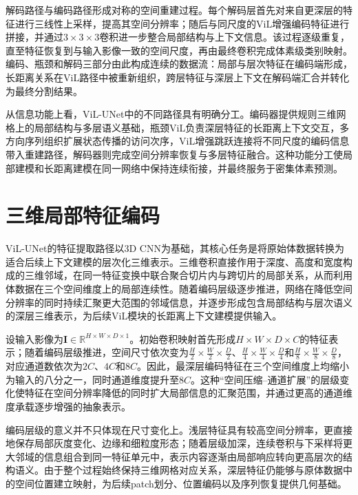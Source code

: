 解码路径与编码路径形成对称的空间重建过程。每个解码层首先对来自更深层的特征进行三线性上采样，提高其空间分辨率；随后与同尺度的ViL增强编码特征进行拼接，并通过\(3\times3\times3\)卷积进一步整合局部结构与上下文信息。该过程逐级重复，直至特征恢复到与输入影像一致的空间尺度，再由最终卷积完成体素级类别映射。编码、瓶颈和解码三部分由此构成连续的数据流：局部与层次特征在编码端形成，长距离关系在ViL路径中被重新组织，跨层特征与深层上下文在解码端汇合并转化为最终分割结果。

从信息功能上看，ViL-UNet中的不同路径具有明确分工。编码器提供规则三维网格上的局部结构与多层语义基础，瓶颈ViL负责深层特征的长距离上下文交互，多方向序列组织扩展状态传播的访问次序，ViL增强跳跃连接将不同尺度的编码信息带入重建路径，解码器则完成空间分辨率恢复与多层特征融合。这种功能分工使局部建模和长距离建模在同一网络中保持连续衔接，并最终服务于密集体素预测。

\section{三维局部特征编码}

ViL-UNet的特征提取路径以3D CNN为基础，其核心任务是将原始体数据转换为适合后续上下文建模的层次化三维表示。三维卷积直接作用于深度、高度和宽度构成的三维邻域，在同一特征变换中联合聚合切片内与跨切片的局部关系，从而利用体数据在三个空间维度上的局部连续性。随着编码层级逐步推进，网络在降低空间分辨率的同时持续汇聚更大范围的邻域信息，并逐步形成包含局部结构与层次语义的深层三维表示，为后续ViL模块的长距离上下文建模提供输入。

设输入影像为\(\mathbf I\in\mathbb R^{H\times W\times D\times1}\)。初始卷积映射首先形成\(H\times W\times D\times C\)的特征表示；随着编码层级推进，空间尺寸依次变为\(\frac{H}{2}\times\frac{W}{2}\times\frac{D}{2}\)、\(\frac{H}{4}\times\frac{W}{4}\times\frac{D}{4}\)和\(\frac{H}{8}\times\frac{W}{8}\times\frac{D}{8}\)，对应通道数依次为\(2C\)、\(4C\)和\(8C\)。因此，最深层编码特征在三个空间维度上均缩小为输入的八分之一，同时通道维度提升至\(8C\)。这种“空间压缩--通道扩展”的层级变化使特征在空间分辨率降低的同时扩大局部信息的汇聚范围，并通过更高的通道维度承载逐步增强的抽象表示。


编码层级的意义并不只体现在尺寸变化上。浅层特征具有较高空间分辨率，更直接地保存局部灰度变化、边缘和细粒度形态；随着层级加深，连续卷积与下采样将更大邻域的信息组合到同一特征单元中，表示内容逐渐由局部响应转向更高层次的结构语义。由于整个过程始终保持三维网格对应关系，深层特征仍能够与原体数据中的空间位置建立映射，为后续patch划分、位置编码以及序列恢复提供几何基础。

